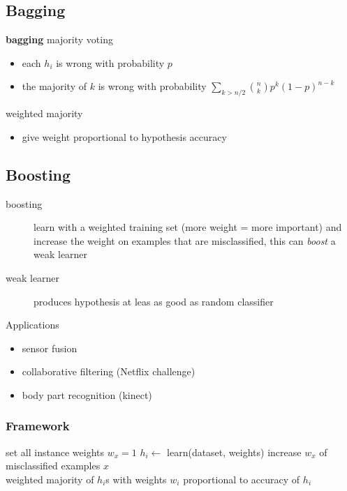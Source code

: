 \documentclass[]{article}
\theoremstyle{definition}
\begin{document}
\subsection{Bagging}
\label{sub:bagging}
\textbf{bagging} majority voting
\begin{itemize}
    \item each $h_i$ is wrong with probability $p$
    \item the majority of $k$ is wrong with probability $\sum_{k > n/2} \binom{n}{k} p^k (1-p)^{n-k}$
\end{itemize}
weighted majority
\begin{itemize}
    \item give weight proportional to hypothesis accuracy
\end{itemize}

\subsection{Boosting}
\label{sub:boosting}
\begin{description}
    \item[boosting] learn with a weighted training set (more weight = more important) and increase the weight on examples that are misclassified, this can \textit{boost} a weak learner
    \item[weak learner] produces hypothesis at leas as good as random classifier
\end{description}

Applications
\begin{itemize}
    \item sensor fusion
    \item collaborative filtering (Netflix challenge)
    \item body part recognition (kinect)
\end{itemize}

\subsubsection{Framework}
\label{ssub:Framework}

\begin{algorithmic}
    \State set all instance weights $w_x = 1$    
    \Repeat
    \State $h_i \gets$ learn(dataset, weights)
    \State increase $w_x$ of misclassified examples $x$
     \\
    \Return weighted majority of $h_i$s with weights $w_i$ proportional to accuracy of $h_i$
\end{algorithmic}
\end{document}
